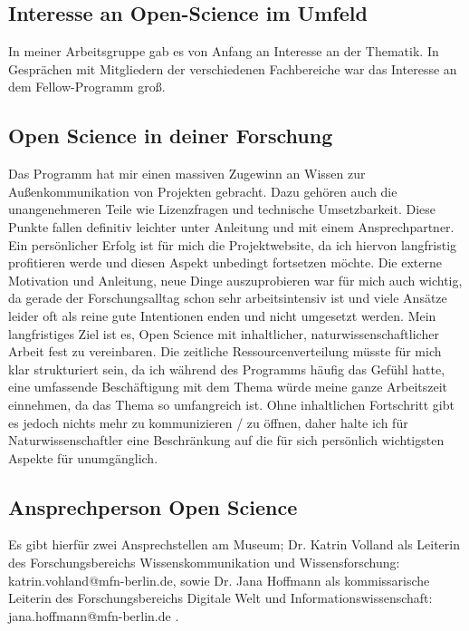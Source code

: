 \documentclass[11pt,a4paper]{article}
\begin{document}
\subsection{Interesse an Open-Science im Umfeld} %
In meiner Arbeitsgruppe gab es von Anfang an Interesse an der Thematik. In Gesprächen mit Mitgliedern der verschiedenen Fachbereiche war das Interesse an dem Fellow-Programm groß.

\subsection{Open Science in deiner Forschung}
Das Programm hat mir einen massiven Zugewinn an Wissen zur Außenkommunikation von Projekten gebracht. Dazu gehören auch die unangenehmeren Teile wie Lizenzfragen und technische Umsetzbarkeit. Diese Punkte fallen definitiv leichter unter Anleitung und mit einem Ansprechpartner. Ein persönlicher Erfolg ist für mich die Projektwebsite, da ich hiervon langfristig profitieren werde und diesen Aspekt unbedingt fortsetzen möchte. Die externe Motivation und Anleitung, neue Dinge auszuprobieren war für mich auch wichtig, da gerade der Forschungsalltag schon sehr arbeitsintensiv ist und viele Ansätze leider oft als reine gute Intentionen enden und nicht umgesetzt werden. 
Mein langfristiges Ziel ist es, Open Science mit inhaltlicher, naturwissenschaftlicher Arbeit fest zu vereinbaren. Die zeitliche Ressourcenverteilung müsste für mich klar strukturiert sein, da ich während des Programms häufig das Gefühl hatte, eine umfassende Beschäftigung mit dem Thema würde meine ganze Arbeitszeit einnehmen, da das Thema so umfangreich ist. Ohne inhaltlichen Fortschritt gibt es jedoch nichts mehr zu kommunizieren / zu öffnen, daher halte ich für Naturwissenschaftler eine Beschränkung auf die für sich persönlich wichtigsten Aspekte für unumgänglich.


\subsection{Ansprechperson Open Science}
Es gibt hierfür zwei Ansprechstellen am Museum; Dr. Katrin Volland als Leiterin des Forschungsbereichs Wissenskommunikation und Wissensforschung: katrin.vohland@mfn-berlin.de, sowie Dr. Jana Hoffmann als kommissarische Leiterin des Forschungsbereichs Digitale Welt und Informationswissenschaft: jana.hoffmann@mfn-berlin.de .
\end{document}
